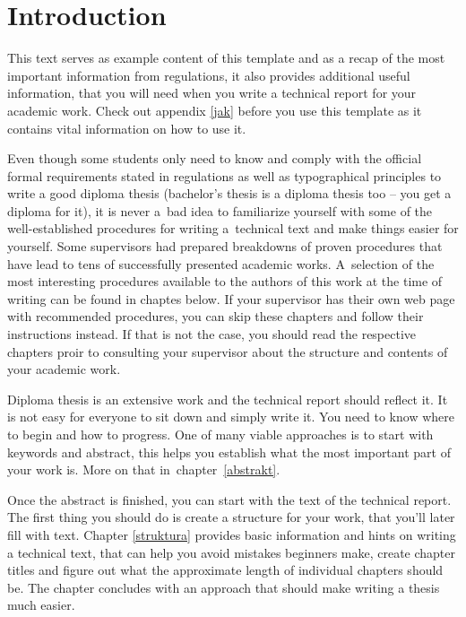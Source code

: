 
% 

\chapter{Introduction}
This text serves as example content of this template and as a recap of the most important information from regulations, it also provides additional useful information, that you will need when you write a technical report for your academic work. Check out appendix \ref{jak} before you use this template as it contains vital information on how to use it.

Even though some students only need to know and comply with the official formal requirements stated in regulations as well as typographical principles to write a good diploma thesis (bachelor's thesis is a diploma thesis too -- you get a diploma for it), it is never a~bad idea to familiarize yourself with some of the well-established procedures for writing a~technical text and make things easier for yourself. Some supervisors had prepared breakdowns of proven procedures that have lead to tens of successfully presented academic works. A~selection of the most interesting procedures available to the authors of this work at the time of writing can be found in chaptes below. If your supervisor has their own web page with recommended procedures, you can skip these chapters and follow their instructions instead. If that is not the case, you should read the respective chapters proir to consulting your supervisor about the structure and contents of your academic work.

Diploma thesis is an extensive work and the technical report should reflect it. It is not easy for everyone to sit down and simply write it. You need to know where to begin and how to progress. One of many viable approaches is to start with keywords and abstract, this helps you establish what the most important part of your work is. More on that in~chapter~\ref{abstrakt}.

Once the abstract is finished, you can start with the text of the technical report. The first thing you should do is create a structure for your work, that you'll later fill with text. Chapter \ref{struktura} provides basic information and hints on writing a technical text, that can help you avoid mistakes beginners make, create chapter titles and figure out what the approximate length of individual chapters should be. The chapter concludes with an approach that should make writing a thesis much easier.

